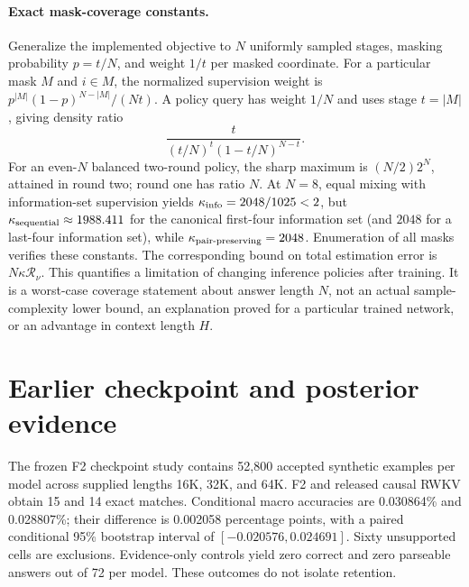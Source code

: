\documentclass{article}
\begin{document}
\paragraph{Exact mask-coverage constants.}
Generalize the implemented objective to $N$ uniformly sampled stages,
masking probability $p=t/N$, and weight $1/t$ per masked coordinate.
For a particular mask $M$ and $i\in M$, the normalized supervision weight is
$p^{|M|}(1-p)^{N-|M|}/(Nt)$. A policy query has weight $1/N$ and uses stage
$t=|M|$, giving density ratio
\[
 \frac{t}{(t/N)^t(1-t/N)^{N-t}}.
\]
For an even-$N$ balanced two-round policy, the sharp maximum is
$(N/2)2^N$, attained in round two; round one has ratio $N$.
At $N=8$, equal mixing with information-set supervision yields
$\kappa_{\rm info}=2048/1025<2$, but
$\kappa_{\rm sequential}\approx1988.411$ for the canonical first-four
information set (and $2048$ for a last-four information set), while
$\kappa_{\rm pair\text{-}preserving}=2048$.
Enumeration of all masks verifies these constants. The corresponding bound
on total estimation error is $N\kappa\mathcal R_\nu$.
This quantifies a limitation of changing inference policies after training.
It is a worst-case coverage statement about answer length $N$, not an actual
sample-complexity lower bound, an explanation proved for a particular trained
network, or an advantage in context length $H$.



\section{Earlier checkpoint and posterior evidence}
\label{app:prior}
The frozen F2 checkpoint study contains 52,800 accepted synthetic examples per
model across supplied lengths 16K, 32K, and 64K. F2 and released causal RWKV
obtain 15 and 14 exact matches. Conditional macro accuracies are 0.030864\%
and 0.028807\%; their difference is 0.002058 percentage points, with a paired
conditional 95\% bootstrap interval of $[-0.020576,0.024691]$. Sixty unsupported
cells are exclusions. Evidence-only controls yield zero correct and zero
parseable answers out of 72 per model. These outcomes do not isolate retention.
\end{document}
